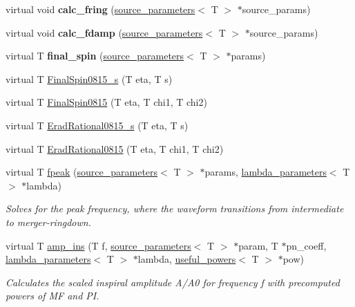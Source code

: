 \begin{DoxyCompactItemize}
virtual void {\bfseries calc\+\_\+fring} (\hyperlink{structsource__parameters}{source\+\_\+parameters}$<$ T $>$ $\ast$source\+\_\+params)
\item 
\mbox{\label{classIMRPhenomD_ad9457c9b6f014e1be5242c90811206c2}} 
virtual void {\bfseries calc\+\_\+fdamp} (\hyperlink{structsource__parameters}{source\+\_\+parameters}$<$ T $>$ $\ast$source\+\_\+params)
\item 
\mbox{\label{classIMRPhenomD_aca95715b46b019637d054e06a1ba1e8f}} 
virtual T {\bfseries final\+\_\+spin} (\hyperlink{structsource__parameters}{source\+\_\+parameters}$<$ T $>$ $\ast$params)
\item 
virtual T \hyperlink{classIMRPhenomD_a75e0b12192eec9c3b7278810236c20a3}{Final\+Spin0815\+\_\+s} (T eta, T s)
\item 
virtual T \hyperlink{classIMRPhenomD_af638fe3433f2367f9dfe6e2236a6b0ee}{Final\+Spin0815} (T eta, T chi1, T chi2)
\item 
virtual T \hyperlink{classIMRPhenomD_a1a9c4c6addd7c73be5bbcd835e92e815}{Erad\+Rational0815\+\_\+s} (T eta, T s)
\item 
virtual T \hyperlink{classIMRPhenomD_a08bc2e3d31a033e590e9e573d3cf914e}{Erad\+Rational0815} (T eta, T chi1, T chi2)
\item 
virtual T \hyperlink{classIMRPhenomD_a31c4222e9a39b6eadd42c4f6707d8245}{fpeak} (\hyperlink{structsource__parameters}{source\+\_\+parameters}$<$ T $>$ $\ast$params, \hyperlink{structlambda__parameters}{lambda\+\_\+parameters}$<$ T $>$ $\ast$lambda)
\begin{DoxyCompactList}\small\item\em Solves for the peak frequency, where the waveform transitions from intermediate to merger-\/ringdown. \end{DoxyCompactList}\item 
virtual T \hyperlink{classIMRPhenomD_aef404dca66beb6652663271fee31b8f8}{amp\+\_\+ins} (T f, \hyperlink{structsource__parameters}{source\+\_\+parameters}$<$ T $>$ $\ast$param, T $\ast$pn\+\_\+coeff, \hyperlink{structlambda__parameters}{lambda\+\_\+parameters}$<$ T $>$ $\ast$lambda, \hyperlink{structuseful__powers}{useful\+\_\+powers}$<$ T $>$ $\ast$pow)
\begin{DoxyCompactList}\small\item\em Calculates the scaled inspiral amplitude A/\+A0 for frequency f with precomputed powers of MF and PI. \end{DoxyCompactList}\item 

\end{DoxyCompactItemize}
